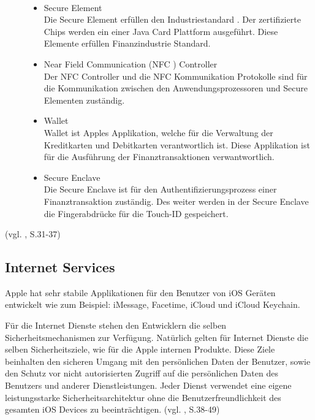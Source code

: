 \begin{description}
\item[\parbox{\textwidth} {Folgende Komponenten gehören zum \glqq Apple
Pay\grqq{} Produkt}]~\par
	\begin{itemize}
		\item Secure Element \\
Die Secure Element erfüllen den Industriestandard . Der zertifizierte Chips
werden ein einer Java Card Plattform ausgeführt.
		Diese Elemente erfüllen Finanzindustrie Standard. 
 		\item Near Field Communication (NFC ) Controller \\
Der NFC Controller und die NFC Kommunikation Protokolle sind für die
Kommunikation zwischen den Anwendungsprozessoren und Secure Elementen
zuständig.
 		\item Wallet \\
Wallet ist Apples Applikation,  welche für die Verwaltung der Kreditkarten und
Debitkarten verantwortlich ist. Diese Applikation ist für die Ausführung der
Finanztransaktionen verwantwortlich.
 		\item Secure Enclave \\
Die \glqq Secure Enclave\grqq{} ist für den Authentifizierungsprozess einer
Finanztransaktion zuständig. Des weiter werden in der  \glqq Secure
Enclave\grqq{}  die Fingerabdrücke für die Touch-ID gespeichert.
        \end{itemize}
\end{description}
(vgl. \cite{Apple[4]}, S.31-37)
\subsection{Internet Services}
\label{sec:InternetServices}

Apple hat sehr stabile Applikationen für den Benutzer von iOS Geräten
entwickelt wie zum Beispiel: iMessage, Facetime, iCloud und iCloud Keychain. 

Für die Internet Dienste stehen den Entwicklern die selben
Sicherheitsmechanismen zur Verfügung. Natürlich gelten für Internet Dienste die
selben Sicherheitsziele, wie für die Apple internen Produkte. 
Diese Ziele beinhalten den sicheren Umgang mit den persönlichen Daten der
Benutzer, sowie den Schutz vor nicht autorisierten Zugriff auf die persönlichen
Daten des Benutzers und anderer Dienstleistungen.
Jeder Dienst verwendet eine eigene leistungsstarke Sicherheitsarchitektur ohne
die Benutzerfreundlichkeit des gesamten iOS Devices zu beeinträchtigen. (vgl.
\cite{Apple[4]}, S.38-49)

